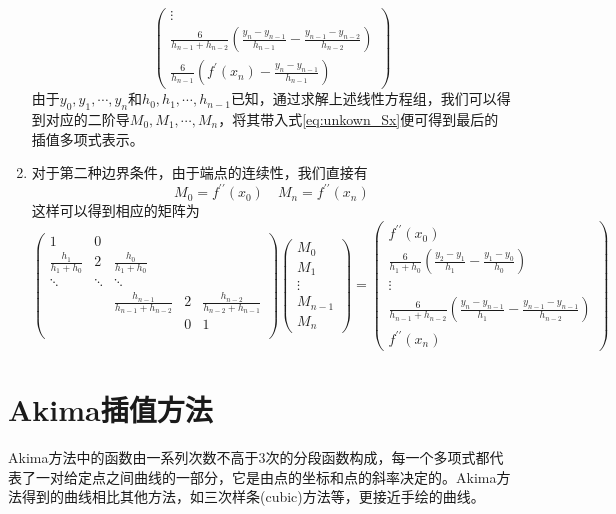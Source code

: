\begin{enumerate}
\begin{equation}
\begin{pmatrix}
				\vdots	\\
				\frac{6}{h_{n-1} + h_{n-2}}\left(\frac{y_n-y_{n-1}}{h_{n-1}} - \frac{y_{n-1} - y_{n-2}}{h_{n-2}}\right) \\
				\frac{6}{h_{n-1}}\left(f^{\prime}(x_n) - \frac{y_{n}-y_{n-1}}{h_{n-1}} \right)
			\end{pmatrix}
		\end{equation}
		由于$y_0, y_1, \cdots, y_n$和$h_0, h_1, \cdots, h_{n-1}$已知，通过求解上述线性方程组，我们可以得到对应的二阶导$M_0, M_1, \cdots, M_n$，将其带入式\eqref{eq:unkown_Sx}便可得到最后的插值多项式表示。
	\item 对于第二种边界条件，由于端点的连续性，我们直接有
		\begin{equation}
			M_0 = f^{\prime\prime}(x_0)	\quad M_n = f^{\prime\prime}(x_n)
		\end{equation} 
		这样可以得到相应的矩阵为
		\begin{equation}
			\begin{pmatrix}
				1						&	0	&	~						&	~	&	~\\
				\frac{h_1}{h_1 + h_{0}}	&	2	&	\frac{h_0}{h_1 + h_0}	&	~	&	~\\
				\ddots	&	\ddots		&	\ddots	&	~	&	~\\
				~		&	~			&	\frac{h_{n-1}}{h_{n-1}+h_{n-2}}	&	2	&	\frac{h_{n-2}}{h_{n-2} + h_{n-1}}\\
				~		&	~			&	~	&	0	&	1\\
			\end{pmatrix}
			\begin{pmatrix}
				M_0		\\
				M_1		\\	
				\vdots	\\
				M_{n-1}	\\
				M_{n}	
			\end{pmatrix}
			=
			\begin{pmatrix}
				f^{\prime\prime}(x_0)	\\
				\frac{6}{h_1 + h_0}\left(\frac{y_2-y_1}{h_1} - \frac{y_1 - y_0}{h_{0}}\right)	\\
				\vdots	\\
				\frac{6}{h_{n-1} + h_{n-2}}\left(\frac{y_n-y_{n-1}}{h_1} - \frac{y_{n-1} - y_{n-1}}{h_{n-2}}\right) \\
				f^{\prime\prime}(x_n)
			\end{pmatrix}
		\end{equation} 
\end{enumerate}


\section{Akima插值方法}
Akima方法中的函数由一系列次数不高于3次的分段函数构成，每一个多项式都代表了一对给定点之间曲线的一部分，它是由点的坐标和点的斜率决定的。Akima方法得到的曲线相比其他方法，如三次样条(cubic)方法等，更接近手绘的曲线。

